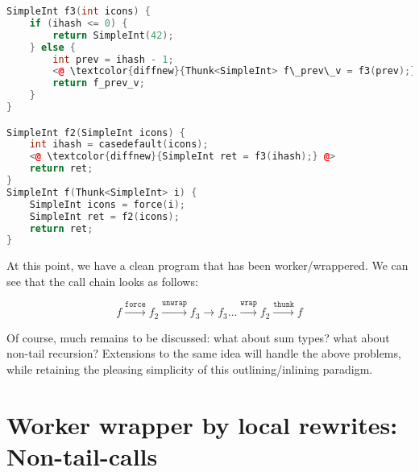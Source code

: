 \documentclass[sigplan,\review anonymous]{acmart}
\begin{document}


{\footnotesize
\begin{lstlisting}[language=c++, caption=taking stock]
SimpleInt f3(int icons) {
    if (ihash <= 0) {
        return SimpleInt(42);
    } else {
        int prev = ihash - 1;
        <@ \textcolor{diffnew}{Thunk<SimpleInt> f\_prev\_v = f3(prev);} @>
        return f_prev_v;
    }
}

SimpleInt f2(SimpleInt icons) {
    int ihash = casedefault(icons);
    <@ \textcolor{diffnew}{SimpleInt ret = f3(ihash);} @>
    return ret;
}
SimpleInt f(Thunk<SimpleInt> i) {
    SimpleInt icons = force(i);
    SimpleInt ret = f2(icons);
    return ret;
}
\end{lstlisting}
}

At this point, we have a clean program that has been worker/wrappered. We can
see that the call chain looks as follows:

$$
f \xrightarrow{\texttt{force}} f_2 \xrightarrow{\texttt{unwrap}} f_3 \to f_3 \dots \xrightarrow{\texttt{wrap}} f_2
\xrightarrow{\texttt{thunk}} f
$$

Of course, much remains to be discussed: what about sum types? what about
non-tail recursion? Extensions to the same idea will handle the above problems,
while retaining the pleasing simplicity of this outlining/inlining paradigm.



\section{Worker wrapper by local rewrites: Non-tail-calls}
\end{document}
